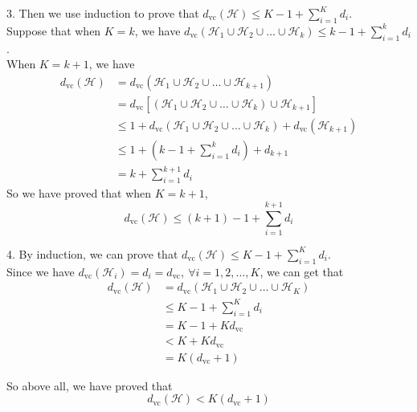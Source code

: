 3. Then we use induction to prove that $d_{\text{vc}}(\mathcal{H})\leq K-1+\sum\limits_{i=1}^{K}d_i$.\\
Suppose that when $K=k$, we have $d_{\text{vc}}(\mathcal{H}_1\cup \mathcal{H}_2\cup \ldots\cup \mathcal{H}_k)\leq k-1+\sum\limits_{i=1}^{k}d_i$.\\
When $K=k+1$, we have
\begin{align*}
    d_{\text{vc}}(\mathcal{H}) &= d_{\text{vc}}(\mathcal{H}_1\cup\mathcal{H}_2\cup\ldots\cup\mathcal{H}_{k+1}) \\
    &= d_{\text{vc}}\left[(\mathcal{H}_1\cup\mathcal{H}_2\cup\ldots\cup\mathcal{H}_{k})\cup\mathcal{H}_{k+1}\right] \\
    &\leq 1 + d_{\text{vc}}(\mathcal{H}_1\cup\mathcal{H}_2\cup\ldots\cup\mathcal{H}_k) + d_{\text{vc}}(\mathcal{H}_{k+1}) \\
    &\leq 1 + \left(k-1+\sum\limits_{i=1}^{k}d_i\right) + d_{k+1}\\
    &= k  +\sum\limits_{i=1}^{k+1}d_i
\end{align*}
So we have proved that when $K=k+1$,
$$d_{\text{vc}}(\mathcal{H})\leq (k + 1) - 1 +\sum\limits_{i=1}^{k+1}d_i$$

4. By induction, we can prove that $d_{\text{vc}}(\mathcal{H})\leq K-1+\sum\limits_{i=1}^{K}d_i$.\\

Since we have $d_{\text{vc}}(\mathcal{H}_i)=d_i=d_{\text{vc}},\ \forall i=1,2,\ldots,K$, we can get that
\begin{align*}
    d_{\text{vc}}(\mathcal{H}) &= d_{\text{vc}}(\mathcal{H}_1 \cup \mathcal{H}_2 \cup \ldots \cup \mathcal{H}_K) \\
    &\leq K-1+\sum\limits_{i=1}^{K}d_i \\
    &= K-1+Kd_{\text{vc}} \\
    &< K+Kd_{\text{vc}} \\
    &= K(d_{\text{vc}}+1)
\end{align*}

So above all, we have proved that
$$d_{\text{vc}}(\mathcal{H})<K(d_{\text{vc}}+1)$$

\newpage